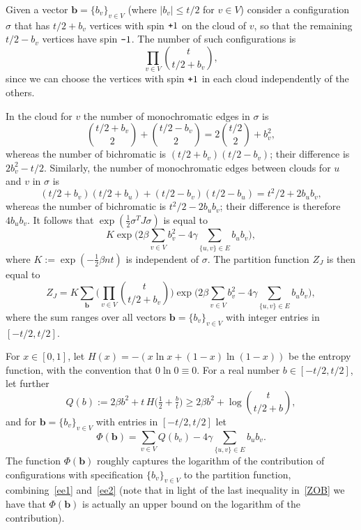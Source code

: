 \documentclass[11pt]{article}
\newcommand{\pl}{\textup{\texttt{+}}}
\newcommand{\mi}{\textup{\texttt{-}}}
\begin{document}
Given a vector $\mathbf{b}=\{b_v\}_{v\in V}$ (where $|b_v|\leq t/2$ for $v\in V$) consider a configuration $\sigma$ that has $t/2 + b_v$
vertices with spin $\pl1$ on the cloud of $v$, so that the remaining $t/2 - b_v$ vertices have spin $\mi1$. The number of
such configurations  is
\begin{equation}\label{ee1}
\prod_{v\in V} {t\choose t/2 + b_v},
\end{equation}
since we can choose the vertices with spin $\pl 1$ in each cloud independently of the others.

In the cloud for $v$ the number of monochromatic edges in $\sigma$ is
$$
{t/2 + b_v\choose 2} + {t/2 - b_v\choose 2} = 2{t/2\choose 2} + b_v^2,
$$
whereas the number of bichromatic is $(t/2+b_v)(t/2-b_v)$; their difference is  $2b_v^2-t/2$. Similarly, the number of monochromatic edges between clouds for $u$ and $v$ in $\sigma$ is
\[
(t/2+b_v)(t/2+b_u) + (t/2-b_v)(t/2-b_u) = t^2/2 + 2 b_u b_v,\]
whereas the number of bichromatic is $t^2/2 - 2 b_u b_v$; their difference is therefore $4b_u b_v$. It follows  that $\exp(\tfrac{1}{2}\sigma^T J\sigma)$ is equal to 
\begin{equation}\label{ee2}
K\exp\Big( 2\beta \sum_{v\in V} b_v^2 - 4 \gamma \sum_{\{u,v\}\in E} b_u b_v \Big),
\end{equation}
where $K:=\exp(-\tfrac{1}{2}\beta n t)$ is independent of $\sigma$. The partition function $Z_J$ is then equal to
\begin{equation}\label{eq:partitionfun}
Z_J = K\sum_{\mathbf{b}} \bigg( \prod_{v\in V} {t\choose t/2 + b_v}\bigg) \exp\Big( 2\beta \sum_{v\in V} b_v^2 - 4 \gamma \sum_{\{u,v\}\in E} b_u b_v \Big),
\end{equation}
where the sum ranges over all vectors $\mathbf{b}=\{b_v\}_{v\in V}$ with integer entries in $[-t/2,t/2]$. 

For $x\in [0,1]$, let $H(x)=- (x\ln x + (1-x)\ln (1-x))$ be the entropy function, with the convention that $0\ln 0\equiv 0$. For a real number $b\in [-t/2,t/2]$, let further
\begin{equation}\label{ZOB}
Q(b):= 2\beta b^2 + t\, H\big(\tfrac{1}{2} + \tfrac{b}{t}\big) \geq  2\beta b^2 + \log {t\choose t/2 + b},
\end{equation}
and for $\mathbf{b}=\{b_v\}_{v\in V}$ with entries in $[-t/2,t/2]$ let
$$
\Phi(\mathbf{b}) = \sum_{v\in V} Q(b_v) - 4\gamma \sum_{\{u,v\}\in E } b_u b_v.
$$
The function $\Phi(\mathbf{b})$ roughly captures the logarithm of the contribution of configurations
with specification $\{b_v\}_{v\in V}$ to the partition function, combining~\eqref{ee1} and~\eqref{ee2} 
(note that in light of the last inequality in~\eqref{ZOB} we have that $\Phi(\mathbf{b})$ is 
actually an upper bound on the logarithm of the contribution).
\end{document}
